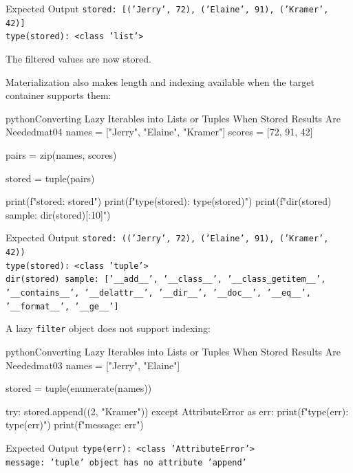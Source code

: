\begin{iobox}{Expected Output}
\texttt{stored: [('Jerry', 72), ('Elaine', 91), ('Kramer', 42)]} \\
\texttt{type(stored): <class 'list'>} \\
\end{iobox}




The filtered values are now stored.

Materialization also makes length and indexing available when the target container supports them:

\begin{codebox}[]{python}{Converting Lazy Iterables into Lists or Tuples When Stored Results Are Needed}{mat04}
names = ["Jerry", "Elaine", "Kramer"]
scores = [72, 91, 42]

pairs = zip(names, scores)

stored = tuple(pairs)

print(f"stored: {stored}")
print(f"type(stored): {type(stored)}")
print(f"dir(stored) sample: {dir(stored)[:10]}")
\end{codebox}


\begin{iobox}{Expected Output}
\texttt{stored: (('Jerry', 72), ('Elaine', 91), ('Kramer', 42))} \\
\texttt{type(stored): <class 'tuple'>} \\
\texttt{dir(stored) sample: ['\_\_add\_\_', '\_\_class\_\_', '\_\_class\_getitem\_\_',} \\
\texttt{'\_\_contains\_\_', '\_\_delattr\_\_', '\_\_dir\_\_', '\_\_doc\_\_', '\_\_eq\_\_',} \\
\texttt{'\_\_format\_\_', '\_\_ge\_\_']} \\
\end{iobox}




A lazy \texttt{filter} object does not support indexing:

\begin{codebox}[]{python}{Converting Lazy Iterables into Lists or Tuples When Stored Results Are Needed}{mat03}
names = ["Jerry", "Elaine"]

stored = tuple(enumerate(names))

try:
    stored.append((2, "Kramer"))
except AttributeError as err:
    print(f"type(err): {type(err)}")
    print(f"message: {err}")
\end{codebox}


\begin{iobox}{Expected Output}
\texttt{type(err): <class 'AttributeError'>} \\
\texttt{message: 'tuple' object has no attribute 'append'} \\
\end{iobox}




